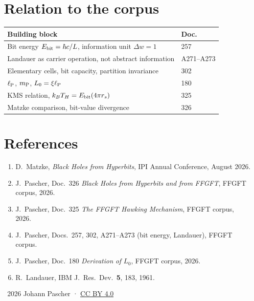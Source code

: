 \section*{Relation to the corpus}

\begin{center}
\begin{tabular}{@{}ll@{}}
  \toprule
  \textbf{Building block} & \textbf{Doc.} \\
  \midrule
  Bit energy $E_{\mathrm{bit}} = \hbar c/L$, information unit $\Delta w = 1$ & 257 \\
  Landauer as carrier operation, not abstract information & A271--A273 \\
  Elementary cells, bit capacity, partition invariance & 302 \\
  $\ell_{\mathrm{P}}$, $m_{\mathrm{P}}$, $L_0 = \xi\ell_{\mathrm{P}}$ & 180 \\
  KMS relation, $k_BT_H = E_{\mathrm{bit}}(4\pi r_s)$ & 325 \\
  Matzke comparison, bit-value divergence & 326 \\
  \bottomrule
\end{tabular}
\end{center}

\section*{References}

\begin{enumerate}
  \item D.~Matzke, \textit{Black Holes from Hyperbits},
    IPI Annual Conference, August 2026.
  \item J.~Pascher, Doc.~326 \textit{Black Holes from Hyperbits and from
    FFGFT}, FFGFT corpus, 2026.
  \item J.~Pascher, Doc.~325 \textit{The FFGFT Hawking Mechanism},
    FFGFT corpus, 2026.
  \item J.~Pascher, Docs.~257, 302, A271--A273 (bit energy, Landauer),
    FFGFT corpus.
  \item J.~Pascher, Doc.~180 \textit{Derivation of $L_0$},
    FFGFT corpus, 2026.
  \item R.~Landauer, IBM J.\ Res.\ Dev.\ \textbf{5}, 183, 1961.
\end{enumerate}

\vspace{6pt}\noindent\small
\textcopyright\ 2026 Johann Pascher ·
\href{https://creativecommons.org/licenses/by/4.0/}{CC BY 4.0}
